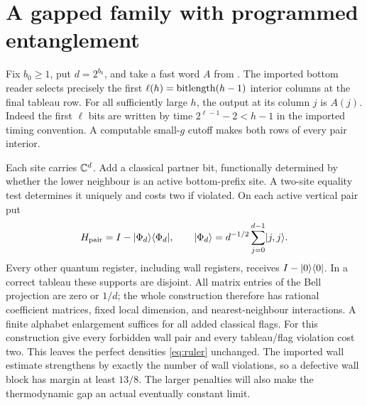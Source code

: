 \section{A gapped family with programmed entanglement}\label{sec:pairs}
Fix $b_0\geq1$, put $d=2^{b_0}$, and take a fast word $A$ from
\cite[Lemma 8.1]{gap}. The imported bottom reader selects precisely
the first $\ell(h)=\operatorname{bitlength}(h-1)$ interior columns at the final
tableau row. For all sufficiently large $h$, the output at its column
$j$ is $A(j)$. Indeed the first $\ell$ bits are written by time
$2^{\ell-1}-2<h-1$ in the imported timing convention. A computable
small-$g$ cutoff makes both rows of every pair interior.

Each site carries $\mathbb C^d$. Add a classical partner bit, functionally
determined by whether the lower neighbour is an active bottom-prefix
site. A two-site equality test determines it uniquely and costs two
if violated. On each active vertical pair put
\begin{equation}\label{eq:pair}
 H_{\rm pair}=I-\lvert\Phi_d\rangle\langle\Phi_d\rvert,\qquad
 \lvert\Phi_d\rangle=d^{-1/2}\sum_{j=0}^{d-1}\lvert j,j\rangle.
\end{equation}
Every other quantum register, including wall registers, receives
$I-\lvert0\rangle\langle0\rvert$. In a correct tableau these supports are disjoint.
All matrix entries of the Bell projection are zero or $1/d$;
the whole construction therefore has rational coefficient matrices,
fixed local dimension, and nearest-neighbour interactions. A finite
alphabet enlargement suffices for all added classical flags.
For this construction give every forbidden wall pair and every
tableau/flag violation cost two. This leaves the perfect densities
\eqref{eq:ruler} unchanged. The imported wall estimate strengthens by
exactly the number of wall violations, so a defective wall block has
margin at least $13/8$. The larger penalties will also make the
thermodynamic gap an actual eventually constant limit.

